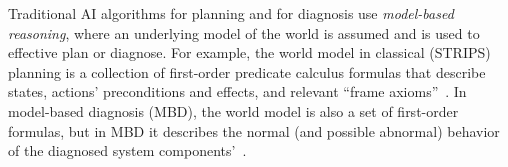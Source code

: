\documentclass[12pt]{article}
\begin{document}





Traditional AI algorithms for planning and for diagnosis use {\em model-based reasoning}, where an underlying model of the world is assumed and is used to effective plan or diagnose. For example, the world model in classical (STRIPS) planning is a collection of first-order predicate calculus formulas that describe states, actions' preconditions and effects, and relevant ``frame axioms''~\cite{ghallab2004automated}. 
In model-based diagnosis (MBD), the world model is also a set of first-order formulas, but in MBD it describes the normal (and possible abnormal) behavior of the diagnosed system components'~\cite{reiter1987theory,deKleer1987diagnosing}. 



\end{document}
